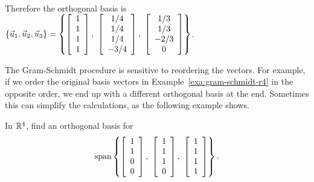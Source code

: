 \documentclass{ximera}
\begin{document}
\begin{solution}
\begin{eqnarray*}
  \end{eqnarray*}
  Therefore the orthogonal basis is
  $\set{\vect{u}_1,\vect{u}_2,\vect{u}_3} = \set{
    \startmat{c} 1 \\ 1 \\ 1 \\ 1 \stopmat,~
    \startmat{c} 1/4 \\ 1/4 \\ 1/4 \\ -3/4 \stopmat,~
    \startmat{c} 1/3 \\ 1/3 \\ -2/3 \\ 0 \stopmat
  }$.
\end{solution}

The Gram-Schmidt procedure is sensitive to reordering the vectors. For
example, if we order the original basis vectors in
Example~\ref{exa:gram-schmidt-r4} in the opposite order, we end up
with a different orthogonal basis at the end. Sometimes this can
simplify the calculations, as the following example shows.

\begin{example}\label{ex:gram-schmidt-r4-b}
  In $\R^4$, find an orthogonal basis for
  \begin{equation*}
    \sspan\set{
      \startmat{c} 1 \\ 1 \\ 0 \\ 0 \stopmat,~
      \startmat{c} 1 \\ 1 \\ 1 \\ 0 \stopmat,~
      \startmat{c} 1 \\ 1 \\ 1 \\ 1 \stopmat
    }.
  \end{equation*}
\end{example}
\end{document}
